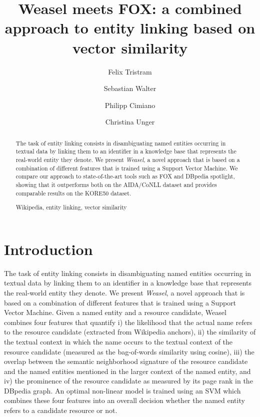 \documentclass[runningheads,a4paper]{llncs}
\newcommand{\keywords}[1]{\par\addvspace\baselineskip
\noindent\keywordname\enspace\ignorespaces#1}
\begin{document}
\mainmatter  %

\newcommand{\acronym}{Weasel}



\title{{\acronym} meets FOX: a combined approach to entity linking based on vector similarity }
\titlerunning{{\acronym} meets FOX}

\author{Felix Tristram \and Sebastian Walter \and Philipp Cimiano  \and Christina Unger}



\maketitle


\begin{abstract}
The task of entity linking consists in disambiguating named entities occurring in textual data by linking them to an identifier in a knowledge base that represents the real-world entity they denote. We present \emph{{\acronym}}, a novel approach that is based on a combination of different features that is trained using a Support Vector Machine. We compare our approach to state-of-the-art tools such as FOX and DBpedia spotlight, showing that it outperforms both on the AIDA/CoNLL dataset and provides comparable results on the KORE50 dataset.

\keywords{Wikipedia, entity linking, vector similarity}
\end{abstract}

\section{Introduction}\label{sec:introduction}

The task of entity linking consists in disambiguating named entities occurring in textual data by linking them to an identifier in a knowledge base that represents the real-world entity they denote. We present \emph{{\acronym}}, a novel approach that is based on a combination of different features that is trained using a Support Vector Machine.  Given a named entity and a resource candidate, {\acronym} combines four features that quantify i) the likelihood that the actual name refers to the resource candidate (extracted from Wikipedia anchors), ii) the similarity of the textual context in which the name occurs to the textual context of the resource candidate (measured as the bag-of-words similarity using cosine), iii) the overlap between the semantic neighborhood signature of the resource candidate and the named entities mentioned in the larger context of the named entity, and iv) the prominence of the resource candidate as measured by its page rank in the DBpedia graph. An optimal non-linear model is trained using an SVM which combines these four features into an overall decision whether the named entity refers to a candidate resource or not.  
\end{document}
